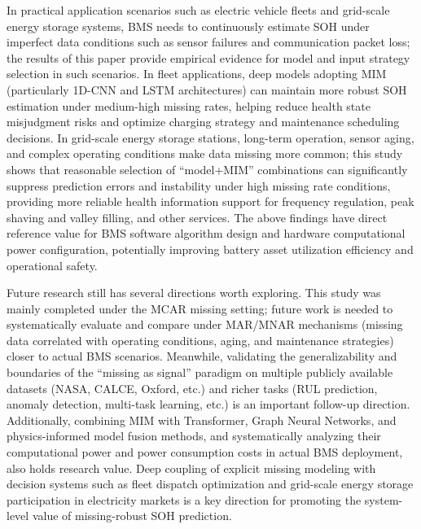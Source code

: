 \documentclass[10pt,a4paper]{article}
\begin{document}
In practical application scenarios such as electric vehicle fleets and grid-scale energy storage systems, BMS needs to continuously estimate SOH under imperfect data conditions such as sensor failures and communication packet loss; the results of this paper provide empirical evidence for model and input strategy selection in such scenarios. In fleet applications, deep models adopting MIM (particularly 1D-CNN and LSTM architectures) can maintain more robust SOH estimation under medium-high missing rates, helping reduce health state misjudgment risks and optimize charging strategy and maintenance scheduling decisions. In grid-scale energy storage stations, long-term operation, sensor aging, and complex operating conditions make data missing more common; this study shows that reasonable selection of ``model+MIM'' combinations can significantly suppress prediction errors and instability under high missing rate conditions, providing more reliable health information support for frequency regulation, peak shaving and valley filling, and other services. The above findings have direct reference value for BMS software algorithm design and hardware computational power configuration, potentially improving battery asset utilization efficiency and operational safety.

Future research still has several directions worth exploring. This study was mainly completed under the MCAR missing setting; future work is needed to systematically evaluate and compare under MAR/MNAR mechanisms (missing data correlated with operating conditions, aging, and maintenance strategies) closer to actual BMS scenarios. Meanwhile, validating the generalizability and boundaries of the ``missing as signal'' paradigm on multiple publicly available datasets (NASA, CALCE, Oxford, etc.) and richer tasks (RUL prediction, anomaly detection, multi-task learning, etc.) is an important follow-up direction. Additionally, combining MIM with Transformer, Graph Neural Networks, and physics-informed model fusion methods, and systematically analyzing their computational power and power consumption costs in actual BMS deployment, also holds research value. Deep coupling of explicit missing modeling with decision systems such as fleet dispatch optimization and grid-scale energy storage participation in electricity markets is a key direction for promoting the system-level value of missing-robust SOH prediction.



\end{document}
